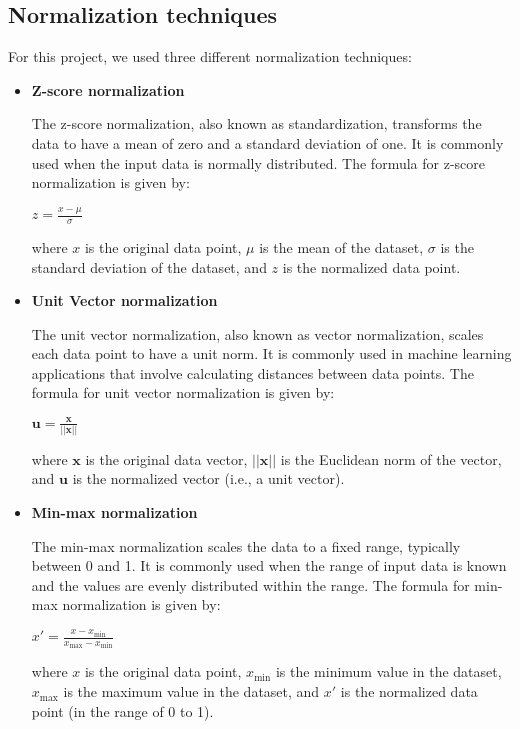 \documentclass[12pt, a4paper]{article}
\begin{document}
\subsection{Normalization techniques}

For this project, we used three different normalization techniques:

\begin{itemize}
\item \textbf{Z-score normalization}
    
    The z-score normalization, also known as standardization, transforms the data to have a mean of zero and a standard deviation of one. It is commonly used when the input data is normally distributed. The formula for z-score normalization is given by:

$z = \frac{x - \mu}{\sigma}$

where $x$ is the original data point, $\mu$ is the mean of the dataset, $\sigma$ is the standard deviation of the dataset, and $z$ is the normalized data point.

\item \textbf{Unit Vector normalization}

The unit vector normalization, also known as vector normalization, scales each data point to have a unit norm. It is commonly used in machine learning applications that involve calculating distances between data points. The formula for unit vector normalization is given by:

$\mathbf{u} = \frac{\mathbf{x}}{||\mathbf{x}||}$

where $\mathbf{x}$ is the original data vector, $||\mathbf{x}||$ is the Euclidean norm of the vector, and $\mathbf{u}$ is the normalized vector (i.e., a unit vector).

\item \textbf{Min-max normalization}

The min-max normalization scales the data to a fixed range, typically between 0 and 1. It is commonly used when the range of input data is known and the values are evenly distributed within the range. The formula for min-max normalization is given by:

$x' = \frac{x - x_{\min}}{x_{\max} - x_{\min}}$

where $x$ is the original data point, $x_{\min}$ is the minimum value in the dataset, $x_{\max}$ is the maximum value in the dataset, and $x'$ is the normalized data point (in the range of 0 to 1).
\end{itemize}
\end{document}
